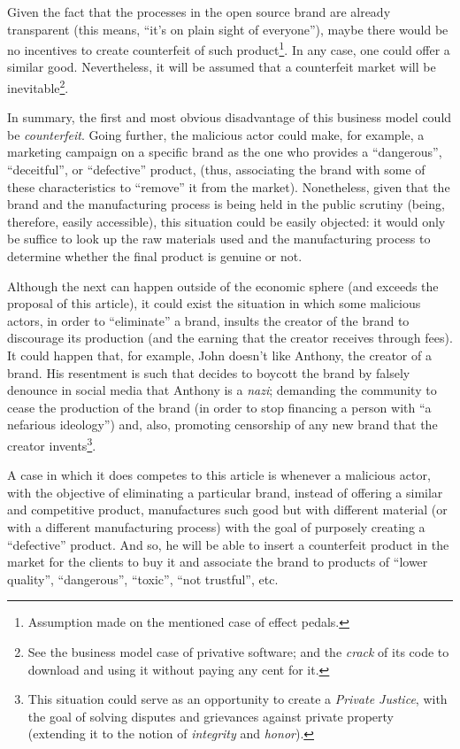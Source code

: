 \documentclass[12pt,a4paper]{article}
\begin{document}
Given the fact that the processes in the open source brand are already transparent (this means, “it's on plain sight of everyone”), maybe there would be no incentives to create counterfeit of such product\footnote{Assumption made on the mentioned case of effect pedals.}. In any case, one could offer a similar good. Nevertheless, it will be assumed that a counterfeit market will be inevitable\footnote{See the business model case of privative software; and the \textit{crack} of its code to download and using it without paying any cent for it.}.

In summary, the first and most obvious disadvantage of this business model could be \textit{counterfeit}. Going further, the malicious actor could make, for example, a marketing campaign on a specific brand as the one who provides a “dangerous”, “deceitful”, or “defective” product, (thus, associating the brand with some of these characteristics to “remove” it from the market). Nonetheless, given that the brand and the manufacturing process is being held in the public scrutiny (being, therefore, easily accessible), this situation could be easily objected: it would only be suffice to look up the raw materials used and the manufacturing process to determine whether the final product is genuine or not.

Although the next can happen outside of the economic sphere (and exceeds the proposal of this article), it could exist the situation in which some malicious actors, in order to “eliminate” a brand, insults the creator of the brand to discourage its production (and the earning that the creator receives through fees). It could happen that, for example, John doesn't like Anthony, the creator of a brand. His resentment is such that decides to boycott the brand by falsely denounce in social media that Anthony is a \textit{nazi}; demanding the community to cease the production of the brand (in order to stop financing a person with “a nefarious ideology”) and, also, promoting censorship of any new brand that the creator invents\footnote{This situation could serve as an opportunity to create a \textit{Private Justice}, with the goal of solving disputes and grievances against private property (extending it to the notion of \textit{integrity} and \textit{honor}).}.

A case in which it does competes to this article is whenever a malicious actor, with the objective of eliminating a particular brand, instead of offering a similar and competitive product, manufactures such good but with different material (or with a different manufacturing process) with the goal of purposely creating a “defective” product. And so, he will be able to insert a counterfeit product in the market for the clients to buy it and associate the brand to products of “lower quality”, “dangerous”, “toxic”, “not trustful”, etc.
\end{document}
